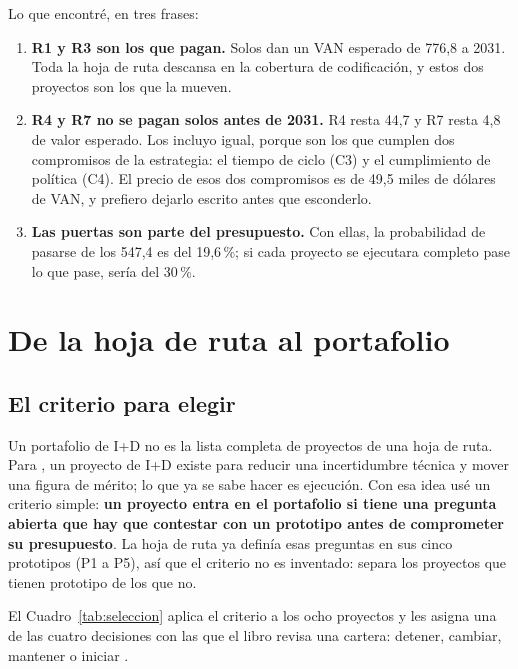 \documentclass[11pt,letterpaper]{article}
\newcommand{\pct}{\,\%}
\begin{document}
Lo que encontré, en tres frases:

\begin{enumerate}
\item \textbf{R1 y R3 son los que pagan.} Solos dan un VAN esperado de 776,8
  a 2031. Toda la hoja de ruta descansa en la cobertura de codificación, y
  estos dos proyectos son los que la mueven.
\item \textbf{R4 y R7 no se pagan solos antes de 2031.} R4 resta 44,7 y R7
  resta 4,8 de valor esperado. Los incluyo igual, porque son los que cumplen
  dos compromisos de la estrategia: el tiempo de ciclo (C3) y el cumplimiento
  de política (C4). El precio de esos dos compromisos es de 49,5 miles de
  dólares de VAN, y prefiero dejarlo escrito antes que esconderlo.
\item \textbf{Las puertas son parte del presupuesto.} Con ellas, la
  probabilidad de pasarse de los 547,4 es del 19,6\pct; si cada proyecto se
  ejecutara completo pase lo que pase, sería del 30\pct.
\end{enumerate}

\section{De la hoja de ruta al portafolio}
\label{sec:seleccion}

\subsection*{El criterio para elegir}

Un portafolio de I+D no es la lista completa de proyectos de una hoja de ruta.
Para \textcite[cap.~16]{deweck2022}, un proyecto de I+D existe para reducir
una incertidumbre técnica y mover una figura de mérito; lo que ya se sabe hacer
es ejecución. Con esa idea usé un criterio simple: \textbf{un proyecto entra en
el portafolio si tiene una pregunta abierta que hay que contestar con un
prototipo antes de comprometer su presupuesto}. La hoja de ruta ya definía esas
preguntas en sus cinco prototipos (P1 a P5), así que el criterio no es
inventado: separa los proyectos que tienen prototipo de los que no.

El Cuadro~\ref{tab:seleccion} aplica el criterio a los ocho proyectos y les
asigna una de las cuatro decisiones con las que el libro revisa una cartera:
detener, cambiar, mantener o iniciar \autocite[fig.~16.17]{deweck2022}.
\end{document}
